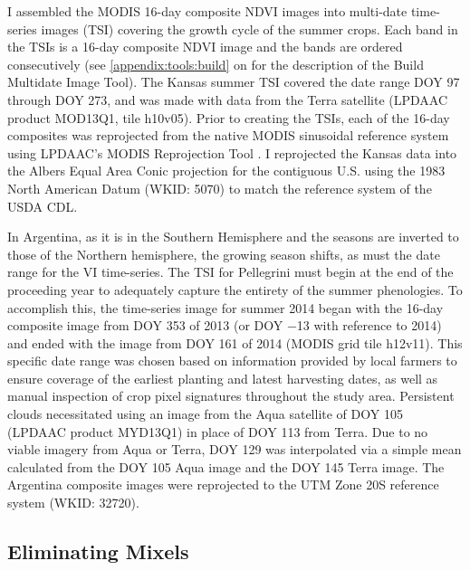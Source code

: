 I assembled the MODIS 16-day composite NDVI images into multi-date time-series images (TSI) covering the growth cycle of the summer crops. Each band in the TSIs is a 16-day composite NDVI image and the bands are ordered consecutively (see \autoref{appendix:tools:build} on  for the description of the Build Multidate Image Tool). The Kansas summer TSI covered the date range DOY 97 through DOY 273, and was made with data from the Terra satellite (LPDAAC product MOD13Q1, tile h10v05). Prior to creating the TSIs, each of the 16-day composites was reprojected from the native MODIS sinusoidal reference system using LPDAAC's MODIS Reprojection Tool \autocite{modis4.1}. I reprojected the Kansas data into the Albers Equal Area Conic projection for the contiguous U.S. using the 1983 North American Datum (WKID: 5070) to match the reference system of the USDA CDL.

In Argentina, as it is in the Southern Hemisphere and the seasons are inverted to those of the Northern hemisphere, the growing season shifts, as must the date range for the VI time-series. The TSI for Pellegrini must begin at the end of the proceeding year to adequately capture the entirety of the summer phenologies. To accomplish this, the time-series image for summer 2014 began with the 16-day composite image from DOY 353 of 2013 (or DOY −13 with reference to 2014) and ended with the image from DOY 161 of 2014 (MODIS grid tile h12v11). This specific date range was chosen based on information provided by local farmers to ensure coverage of the earliest planting and latest harvesting dates, as well as manual inspection of crop pixel signatures throughout the study area. Persistent clouds necessitated using an image from the Aqua satellite of DOY 105 (LPDAAC product MYD13Q1) in place of DOY 113 from Terra. Due to no viable imagery from Aqua or Terra, DOY 129 was interpolated via a simple mean calculated from the DOY 105 Aqua image and the DOY 145 Terra image. The Argentina composite images were reprojected to the UTM Zone 20S reference system (WKID: 32720).

\subsection{Eliminating Mixels}
\label{methods:mixels}

